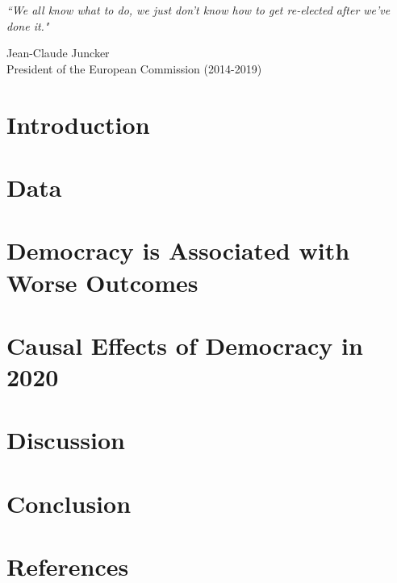 \pagebreak \newpage
\begin{displayquote}
\begin{flushleft}
\textit{``We all know what to do, we just don't know how to get re-elected after we've done it."} 
\end{flushleft}

\begin{flushright}
Jean-Claude Juncker \\
President of the European Commission (2014-2019)
\end{flushright}
\end{displayquote}

\section{Introduction} \label{sec:intro}


\section{Data} \label{sec:data}


\section{Democracy is Associated with Worse Outcomes} \label{sec:ols}


\section{Causal Effects of Democracy in 2020} \label{sec:causal}


\section{Discussion} \label{sec:robust}


\section{Conclusion} \label{sec:conclusion}


\newpage


\newpage
\section*{References}

{\footnotesize
}

